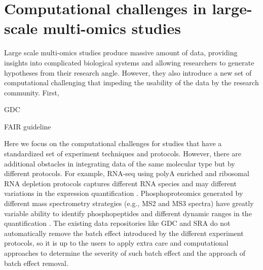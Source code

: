 


\section{Computational challenges in large-scale multi-omics studies}
Large scale multi-omics studies produce massive amount of data, providing insights into complicated biological systems and allowing researchers to generate hypotheses from their research angle. However, they also introduce a new set of computational challenging that impeding the usability of the data by the research community. First,


GDC\cite{heathap_grossmanrl:NCIGenomic2021}

FAIR guideline \cite{wilkinsonmd_monsb:FAIRGuiding2016}


Here we focus on the computational challenges for studies that have a standardized set of experiment techniques and protocols. However, there are additional obstacles in integrating data of the same molecular type but by different protocols. For example, RNA-seq using polyA enriched and ribosomal RNA depletion protocols captures different RNA species and may different variations in the expression quantification \cite{cuip_yuj:ComparisonRibominus2010,chenl_chenl:PairedRRNAdepleted2020}. Phosphoproteomics generated by different mass spectrometry strategies (e.g., MS2 and MS3 spectra) have greatly variable ability to identify phosphopeptides and different dynamic ranges in the quantification \cite{ulintzpj_nesvizhskiiai:ComparisonMS2only2009}. The existing data repositories like GDC and SRA do not automatically remove the batch effect introduced by the different experiment protocols, so it is up to the users to apply extra care and computational approaches to determine the severity of such batch effect and the approach of batch effect removal.


